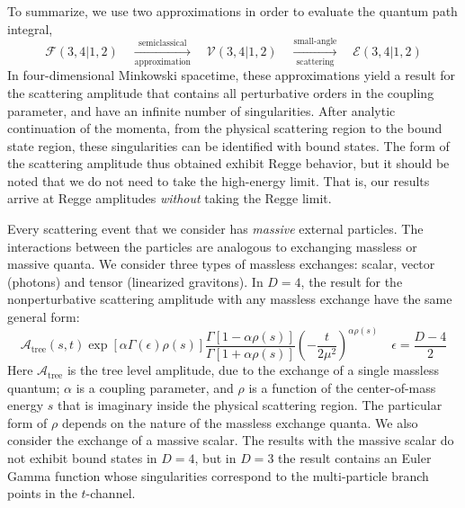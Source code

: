To summarize, we use two approximations in order to evaluate the quantum path integral,
\begin{equation}
	\mathcal{F}(3,4|1,2) \quad \xrightarrow[\text{approximation}]{\text{semiclassical}} \quad \mathcal{V}(3,4|1,2) \quad \xrightarrow[\text{scattering}]{\text{small-angle}} \quad \mathcal{E}(3,4|1,2)
\end{equation}
In four-dimensional Minkowski spacetime, these approximations yield a result for the scattering amplitude that contains all perturbative orders in the coupling parameter, and have an infinite number of singularities. After analytic continuation of the momenta, from the physical scattering region to the bound state region, these singularities can be identified with bound states. The form of the scattering amplitude thus obtained exhibit Regge behavior, but it should be noted that we do not need to take the high-energy limit. That is, our results arrive at Regge amplitudes \textit{without} taking the Regge limit.

Every scattering event that we consider has \textit{massive} external particles. The interactions between the particles are analogous to exchanging massless or massive quanta. We consider three types of massless exchanges: scalar, vector (photons) and tensor (linearized gravitons). In $D = 4$, the result for the nonperturbative scattering amplitude with any massless exchange have the same general form:
\begin{equation}
	\mathcal{A}_{\text{tree}}(s, t) \exp{\left[ \alpha \Gamma(\epsilon) \rho(s) \right]} \frac{\Gamma[1 - \alpha \rho(s) ]}{\Gamma[1 + \alpha \rho(s) ]} \left( - \frac{t}{2 \mu^{2}} \right)^{\alpha \rho(s)} \quad \epsilon = \frac{D - 4}{2}
\end{equation}
Here $\mathcal{A}_{\text{tree}}$ is the tree level amplitude, due to the exchange of a single massless quantum; $\alpha$ is a coupling parameter, and $\rho$ is a function of the center-of-mass energy $s$ that is imaginary inside the physical scattering region. The particular form of $\rho$ depends on the nature of the massless exchange quanta. We also consider the exchange of a massive scalar. The results with the massive scalar do not exhibit bound states in $D = 4$, but in $D = 3$ the result contains an Euler Gamma function whose singularities correspond to the multi-particle branch points in the $t$-channel.

